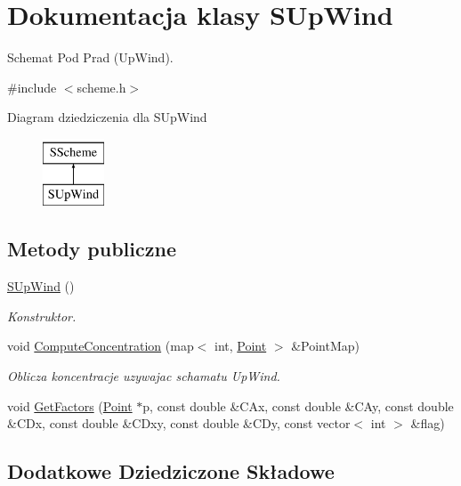\hypertarget{class_s_up_wind}{}\section{Dokumentacja klasy S\+Up\+Wind}
\label{class_s_up_wind}


Schemat Pod Prad (Up\+Wind).  




{\ttfamily \#include $<$scheme.\+h$>$}

Diagram dziedziczenia dla S\+Up\+Wind\begin{figure}[H]
\begin{center}
\leavevmode
\includegraphics[height=2.000000cm]{class_s_up_wind}
\end{center}
\end{figure}
\subsection*{Metody publiczne}
\begin{DoxyCompactItemize}
\item 
\hyperlink{class_s_up_wind_a92e3d5f059c9f8ae6e1ee5e3d547f144}{S\+Up\+Wind} ()
\begin{DoxyCompactList}\small\item\em Konstruktor. \end{DoxyCompactList}\item 
void \hyperlink{class_s_up_wind_a500de829a9c8da4b43cb411014ff3b35}{Compute\+Concentration} (map$<$ int, \hyperlink{class_point}{Point} $>$ \&Point\+Map)
\begin{DoxyCompactList}\small\item\em Oblicza koncentracje uzywajac schamatu Up\+Wind. \end{DoxyCompactList}\item 
void \hyperlink{class_s_up_wind_a64e2e7d8ce37fd489c375fdd9a99c105}{Get\+Factors} (\hyperlink{class_point}{Point} $\ast$p, const double \&C\+Ax, const double \&C\+Ay, const double \&C\+Dx, const double \&C\+Dxy, const double \&C\+Dy, const vector$<$ int $>$ \&flag)
\end{DoxyCompactItemize}
\subsection*{Dodatkowe Dziedziczone Składowe}


